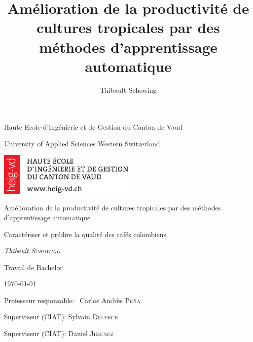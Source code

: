 \documentclass[11pt,a4paper]{report}
\author{Thibault Schowing}
\title{Amélioration de la productivité de cultures tropicales par des méthodes d'apprentissage automatique}
\newcommand\blankpage{%
	\null
	\thispagestyle{empty}%
	\addtocounter{page}{-1}%
	\newpage}
\begin{document}
	
	\begin{titlepage}
		\centering
		
		\small{Haute Ecole d'Ingénierie et de Gestion du Canton de Vaud  \par}
		\footnotesize{University of Applied Sciences Western Switzerland\par}
		\vspace{1cm}
		
		\includegraphics[width=0.5\textwidth]{HEIG-VD_Logo}\par
		
		\vspace{1cm}
		\Large{Amélioration de la productivité de cultures tropicales par des méthodes d'apprentissage automatique\par}
		\vspace{1.5cm}
		\small{Caractériser et prédire la qualité des cafés colombiens \par}
		\vspace{2cm}
		\small\textit{Thibault \textsc{Schowing}}\par
		\small{Travail de Bachelor}\par
		\small{\today\par}
		
		\vfill
		Professeur responsable: ~Carlos Andrès \textsc{Peña}\par
		Superviseur (CIAT): Sylvain \textsc{Delerce} \par
		Superviseur (CIAT): Daniel \textsc{Jimenez}
		
		
	\end{titlepage}
	
	\afterpage{\blankpage}
	
	
	
	\afterpage{\blankpage}
	
	
	
	\afterpage{\blankpage}
	
	\tableofcontents
	
	\afterpage{\blankpage}
	
	
	
	
	
	
	
	{}
	
	
	
\end{document}
